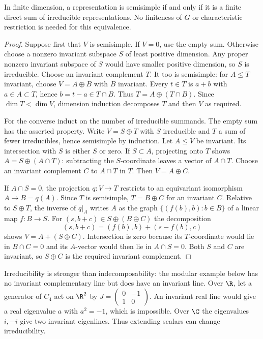 \begin{theorem}\label{thm:semisimple-finite-sum}
In finite dimension, a representation is semisimple if and only if it
is a finite direct sum of irreducible representations. No finiteness
of $G$ or characteristic restriction is needed for this equivalence.
\end{theorem}
\begin{proof}
Suppose first that $V$ is semisimple. If $V=0$, use the empty sum.
Otherwise choose a nonzero invariant subspace $S$ of least positive
dimension. Any proper nonzero invariant subspace of $S$ would have
smaller positive dimension, so $S$ is irreducible. Choose an invariant
complement $T$. It too is semisimple: for $A\le T$ invariant, choose
$V=A\oplus B$ with $B$ invariant. Every $t\in T$ is $a+b$ with
$a\in A\subset T$, hence $b=t-a\in T\cap B$. Thus
$T=A\oplus(T\cap B)$. Since $\dim T<\dim V$, dimension induction
decomposes $T$ and then $V$ as required.

For the converse induct on the number of irreducible summands. The
empty sum has the asserted property. Write $V=S\oplus T$ with $S$
irreducible and $T$ a sum of fewer irreducibles, hence semisimple by
induction. Let $A\le V$ be invariant. Its intersection with $S$ is
either $S$ or zero. If $S\subset A$, projecting onto $T$ shows
$A=S\oplus(A\cap T)$: subtracting the $S$-coordinate leaves a
vector of $A\cap T$. Choose an invariant complement $C$ to $A\cap T$
in $T$. Then $V=A\oplus C$.

If $A\cap S=0$, the projection $q:V\to T$ restricts to an
equivariant isomorphism $A\to B=q(A)$. Since $T$ is semisimple,
$T=B\oplus C$ for an invariant $C$. Relative to $S\oplus T$, the
inverse of $q|_A$ writes $A$ as the graph
$\{(f(b),b):b\in B\}$ of a linear map $f:B\to S$.
For $(s,b+c)\in S\oplus(B\oplus C)$ the decomposition
\[
 (s,b+c)=(f(b),b)+(s-f(b),c)
\]
shows $V=A+(S\oplus C)$. Intersection is zero because its
$T$-coordinate would lie in $B\cap C=0$ and its $A$-vector would
then lie in $A\cap S=0$. Both $S$ and $C$ are invariant, so
$S\oplus C$ is the required invariant complement.
\end{proof}
Irreducibility is stronger than indecomposability: the modular example
below has no invariant complementary line but does have an invariant
line. Over $\R$, let a generator of $C_4$ act on $\R^2$ by
$J=\left(\begin{smallmatrix}0&-1\\1&0\end{smallmatrix}\right)$.
An invariant real line would give a real eigenvalue $a$ with $a^2=-1$,
which is impossible. Over $\C$ the eigenvalues $i,-i$ give two
invariant eigenlines. Thus extending scalars can change irreducibility.

